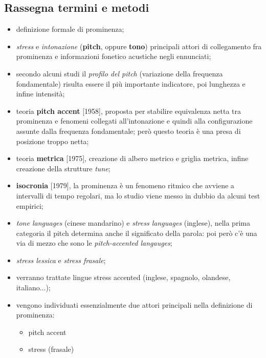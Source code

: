 \documentclass[twoside,twocolumn]{article}
\theoremstyle{definition}
\begin{document}
	\subsection{Rassegna termini e metodi}
		\begin{itemize}
			\item definizione formale di prominenza;
			\item \textit{stress} e \textit{intonazione} (\textbf{pitch}, oppure \textbf{tono}) principali attori di collegamento fra prominenza e informazioni fonetico acustiche negli ennunciati;
			\item secondo alcuni studi il \textit{profilo del pitch} (variazione della frequenza fondamentale) risulta essere il più importante indicatore, poi lunghezza e infine intensità;
			\item teoria \textbf{pitch accent} [1958], proposta per stabilire equivalenza netta tra prominenza e fenomeni collegati all'intonazione e quindi alla configurazione assunte dalla frequenza fondamentale; però questo teoria è una presa di posizione troppo netta;
			\item teoria \textbf{metrica} [1975], creazione di albero metrico e griglia metrica, infine creazione della strutture \textit{tune};
			\item \textbf{isocronia} [1979], la prominenza è un fenomeno ritmico che avviene a intervalli di tempo regolari, ma lo studio viene messo in dubbio da alcuni test empirici;
			\item \textit{tone languages} (cinese mandarino) e \textit{stress languages} (inglese), nella prima categoria il pitch determina anche il significato della parola: poi però c'è una via di mezzo che sono le \textit{pitch-accented langauges};
			\item \textit{stress lessica} e \textit{stress frasale};
			\item verranno trattate lingue stress accented (inglese, spagnolo, olandese, italiano...);
			\item vengono individuati essenzialmente due attori principali nella definizione di prominenza:
			\begin{itemize}
				\item pitch accent
				\item stress (frasale)
			\end{itemize}
		\end{itemize}
	
\end{document}
